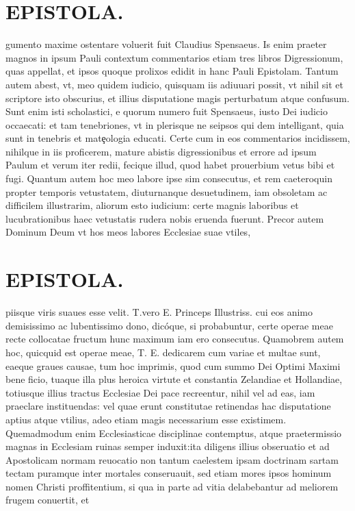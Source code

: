 \documentclass{article}
\begin{document}
\begin{pages}
\section*{EPISTOLA. }\pstart gumento maxime ostentare voluerit fuit Claudius Spensaeus. Is enim praeter magnos in ipsum Pauli contextum commentarios etiam tres libros Digressionum, quas appellat, et ipsos quoque prolixos edidit in hanc Pauli Epistolam. Tantum autem abest, vt, meo quidem iudicio, quisquam iis adiuuari possit, vt nihil sit et scriptore isto obscurius, et illius disputatione magis perturbatum atque confusum. Sunt enim isti scholastici, e quorum numero fuit Spensaeus, iusto Dei iudicio occaecati: et tam tenebriones, vt in plerisque ne seipsos qui dem intelligant, quia sunt in tenebris et matȩologia educati. Certe cum in eos commentarios incidissem, nihilque in iis proficerem, mature abistis digressionibus et errore ad ipsum Paulum et verum iter redii, fecique illud, quod habet prouerbium vetus bibi et fugi. Quantum autem hoc meo labore ipse sim consecutus, et rem caeteroquin propter temporis vetustatem, diuturnanque desuetudinem, iam obsoletam ac difficilem illustrarim, aliorum esto iudicium: certe magnis laboribus et lucubrationibus haec vetustatis rudera nobis eruenda fuerunt. Precor autem Dominum Deum vt hos meos labores Ecclesiae suae vtiles,  \pend
\section*{EPISTOLA. }\pstart piisque viris suaues esse velit. T.vero E. Princeps Illustriss. cui eos animo demisissimo ac lubentissimo dono, dicóque, si probabuntur, certe operae meae recte collocatae fructum hunc maximum iam ero consecutus. Quamobrem autem hoc, quicquid est operae meae, T. E. dedicarem cum variae et multae sunt, eaeque graues causae, tum hoc imprimis, quod cum summo Dei Optimi Maximi bene ficio, tuaque illa plus heroica virtute et constantia Zelandiae et Hollandiae, totiusque illius tractus Ecclesiae Dei pace recreentur, nihil vel ad eas, iam praeclare instituendas: vel quae erunt constitutae retinendas hac disputatione aptius atque vtilius, adeo etiam magis necessarium esse existimem. Quemadmodum enim Ecclesiasticae disciplinae contemptus, atque praetermissio magnas in Ecclesiam ruinas semper induxit:ita diligens illius obseruatio et ad Apostolicam normam reuocatio non tantum caelestem ipsam doctrinam sartam tectam puramque inter mortales conseruauit, sed etiam mores ipsos hominum nomen Christi proffitentium, si qua in parte ad vitia delabebantur ad meliorem frugem conuertit, et  \pend

\end{pages}
\end{document}
